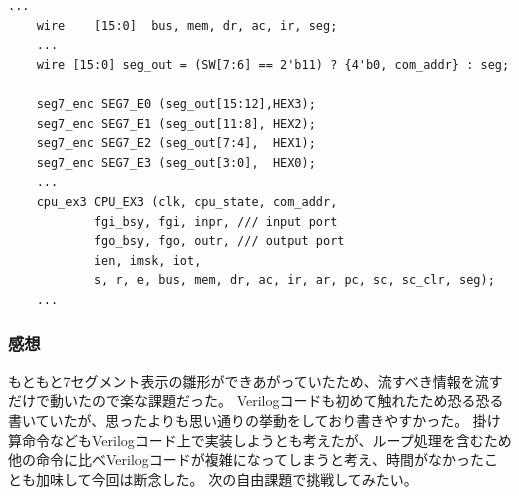 \documentclass{jsarticle}
\begin{document}
\begin{lstlisting}[caption=fpga\_ex3.v]
    ...
    wire    [15:0]  bus, mem, dr, ac, ir, seg;
    ...
    wire [15:0] seg_out = (SW[7:6] == 2'b11) ? {4'b0, com_addr} : seg;

    seg7_enc SEG7_E0 (seg_out[15:12],HEX3);
    seg7_enc SEG7_E1 (seg_out[11:8], HEX2);
    seg7_enc SEG7_E2 (seg_out[7:4],  HEX1);
    seg7_enc SEG7_E3 (seg_out[3:0],  HEX0);
    ...
    cpu_ex3 CPU_EX3 (clk, cpu_state, com_addr,
            fgi_bsy, fgi, inpr, /// input port
            fgo_bsy, fgo, outr, /// output port
            ien, imsk, iot,
            s, r, e, bus, mem, dr, ac, ir, ar, pc, sc, sc_clr, seg);
    ...
\end{lstlisting}

\subsubsection*{感想}
もともと7セグメント表示の雛形ができあがっていたため、流すべき情報を流すだけで動いたので楽な課題だった。
Verilogコードも初めて触れたため恐る恐る書いていたが、思ったよりも思い通りの挙動をしており書きやすかった。
掛け算命令などもVerilogコード上で実装しようとも考えたが、ループ処理を含むため他の命令に比べVerilogコードが複雑になってしまうと考え、時間がなかったことも加味して今回は断念した。
次の自由課題で挑戦してみたい。
\end{document}
